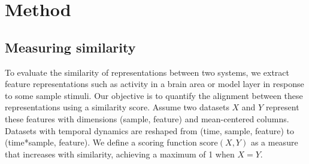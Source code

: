 \documentclass{article} %
\def\myspaceaftersections{\vspace{-0.2cm}}%
\begin{document}



\section{Method} \myspaceaftersections

\subsection{Measuring similarity}
To evaluate the similarity of representations between two systems, we extract feature representations such as activity in a brain area or model layer in response to some sample stimuli. Our objective is to quantify the alignment between these representations using a similarity score. Assume two datasets $X$ and $Y$ represent these features with dimensions (sample, feature) and mean-centered columns. Datasets with temporal dynamics are reshaped from (time, sample, feature) to (time*sample, feature). We define a scoring function $\text{score}(X, Y)$ as a measure that increases with similarity, achieving a maximum of 1 when $X = Y$. 
\end{document}

